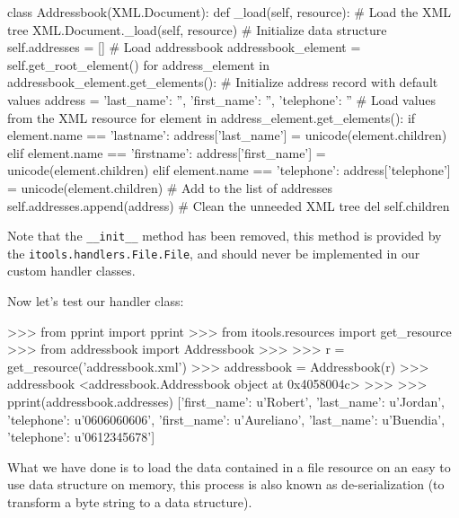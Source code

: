 \begin{code}
    class Addressbook(XML.Document):
        def _load(self, resource):
            # Load the XML tree
            XML.Document._load(self, resource)
            # Initialize data structure
            self.addresses = []
            # Load addressbook
            addressbook_element = self.get_root_element()
            for address_element in addressbook_element.get_elements():
                # Initialize address record with default values
                address = {'last_name': '',
                           'first_name': '',
                           'telephone': ''}
                # Load values from the XML resource
                for element in address_element.get_elements():
                    if element.name == 'lastname':
                        address['last_name'] = unicode(element.children)
                    elif element.name == 'firstname':
                        address['first_name'] = unicode(element.children)
                    elif element.name == 'telephone':
                        address['telephone'] = unicode(element.children)
                # Add to the list of addresses
                self.addresses.append(address)
            # Clean the unneeded XML tree
            del self.children
\end{code}

Note that the {\tt \_\_init\_\_} method has been removed, this method is
provided by the {\tt itools.handlers.File.File}, and should never be
implemented in our custom handler classes.

Now let's test our handler class:

\begin{code}
    >>> from pprint import pprint
    >>> from itools.resources import get_resource
    >>> from addressbook import Addressbook
    >>>
    >>> r = get_resource('addressbook.xml')
    >>> addressbook = Addressbook(r)
    >>> addressbook
    <addressbook.Addressbook object at 0x4058004c>
    >>> 
    >>> pprint(addressbook.addresses)
    [{'first_name': u'Robert',
      'last_name': u'Jordan',
      'telephone': u'0606060606'},
     {'first_name': u'Aureliano',
      'last_name': u'Buendia',
      'telephone': u'0612345678'}]
\end{code}

What we have done is to load the data contained in a file resource on an
easy to use data structure on memory, this process is also known as
de-serialization (to transform a byte string to a data structure).

